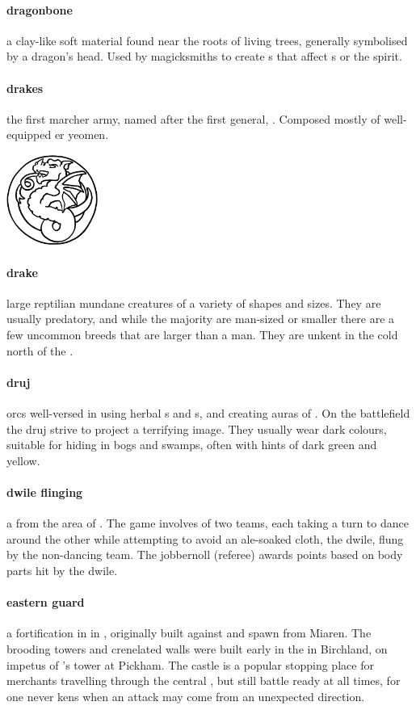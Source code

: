 \paragraph{dragonbone} a clay-like soft material found near the roots of living trees, generally symbolised by a dragon's head. Used by magicksmiths to create s that affect s or the spirit.
\paragraph{drakes} the first marcher army, named after the first general, . Composed mostly of well-equipped er yeomen.\begin{center}\includegraphics[width=3cm]{encyclopedia/Drakes}\end{center}
\paragraph{drake} large reptilian mundane creatures of a variety of shapes and sizes. They are usually predatory, and while the majority are man-sized or smaller there are a few uncommon breeds that are larger than a man. They are unkent in the cold north of the .
\paragraph{druj}  orcs well-versed in using herbal s and s, and creating auras of . On the battlefield the druj strive to project a terrifying image. They usually wear dark colours, suitable for hiding in bogs and swamps, often with hints of dark green and yellow.
\paragraph{dwile flinging} a  from the area of . The game involves of two teams, each taking a turn to dance around the other while attempting to avoid an ale-soaked cloth, the dwile, flung by the non-dancing team. The jobbernoll (referee) awards points based on body parts hit by the dwile.
\paragraph{eastern guard} a fortification in  in , originally built against  and spawn from Miaren. The brooding towers and crenelated walls were built early in the  in Birchland, on impetus of 's tower at Pickham. The castle is a popular stopping place for merchants travelling through the central , but still battle ready at all times, for one never kens when an attack may come from an unexpected direction. 
